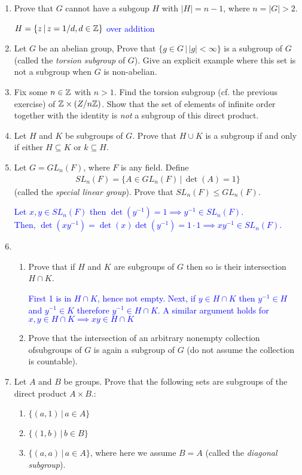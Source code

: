 \documentclass[10pt,a4paper]{report}
\newcommand{\BLUE}[1]{\textcolor{blue}{#1}}
\begin{document}
\begin{enumerate}
\item Prove that $G$ cannot have a subgoup $H$ with $|H|=n-1$, where $n=|G|>2$.

\BLUE{$H =\{z \,|\, z=1/d, d \in \mathbb{Z}\}$ over addition}

\item Let $G$ be an abelian group, Prove that $\{g \in G\,|\,|g|< \infty \}$ is a subgroup of $G$ (called the \textit{torsion subgroup} of $G$).  Give an explicit example where this set is not a subgroup when $G$ is non-abelian.

\item Fix some $n \in \mathbb{Z}$ with $n > 1$. Find the torsion subgroup (cf. the previous exercise) of $\mathbb{Z} \times (Z/n\mathbb{Z})$.  Show that the set of elements of infinite order together with the identity is \textit{not} a subgroup of this direct product.

\item Let $H$ and $K$ be subgroups of $G$.  Prove that $H \cup K$ is a subgroup if and only if either $H \subseteq K$ or $k \subseteq H$.

\item Let $G=GL_n(F)$, where $F$ is any field.  Define 
\begin{align*}
	SL_n(F)=\{A \in GL_n(F)\,|\, \det(A) = 1\}
\end{align*}(called the \textit{special linear group}).  Prove that $SL_n(F) \le GL_n(F)$.

\BLUE{Let $x,y \in SL_n(F)$ then $\det(y^{-1}) = 1 \implies y^{-1} \in SL_n(F)$.  \\Then, $\det(xy^{-1})= \det(x)\det(y^{-1})=1\cdot 1 \implies xy^{-1} \in SL_n(F)$.
}

\item \begin{enumerate}
	\item Prove that if $H$ and $K$ are subgroups of $G$ then so is their intersection $H\cap K$.
	
	\BLUE{First 1 is in $H \cap K$, hence not empty.  Next, if $y \in H \cap K$ then $y^{-1} \in H$ and $y^{-1} \in K$ therefore $y^{-1} \in H \cap K$.  A similar argument holds for $x,y \in H\cap K \implies xy\in H\cap K$
	}
	
	\item Prove that the intersection of an arbitrary nonempty collection ofsubgroups of $G$ is again a subgroup of $G$ (do not assume the collection is countable).
\end{enumerate}

\item Let $A$ and $B$ be groups.  Prove that the following sets are subgroups of the direct product $A\times B$.:
\begin{enumerate}
	\item $\{(a,1)\,|\, a \in A\}$
	\item $\{(1,b)\,|\, b \in B\}$
	\item $\{(a,a)\,|\, a\in A\}$, where here we assume $B=A$ (called the \textit{diagonal subgroup}).
\end{enumerate}


\end{enumerate}
\end{document}
